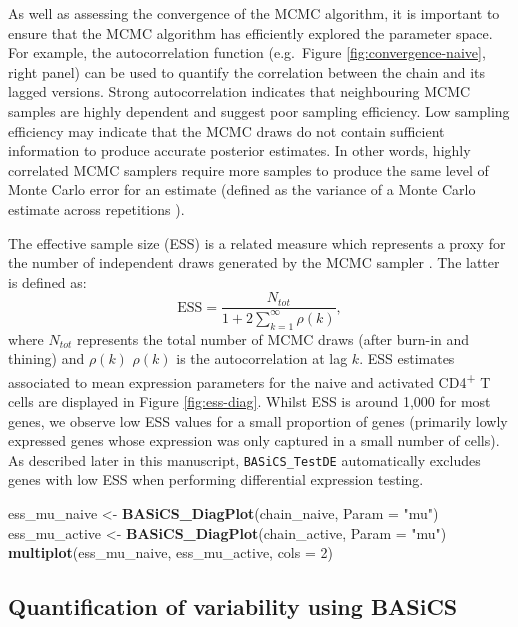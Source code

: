 \documentclass[9pt,a4paper,]{extarticle}
\newenvironment{Shaded}{\begin{snugshade}}{\end{snugshade}}
\newcommand{\DataTypeTok}[1]{\textcolor[rgb]{0.13,0.29,0.53}{#1}}
\newcommand{\DecValTok}[1]{\textcolor[rgb]{0.00,0.00,0.81}{#1}}
\newcommand{\KeywordTok}[1]{\textcolor[rgb]{0.13,0.29,0.53}{\textbf{#1}}}
\newcommand{\NormalTok}[1]{#1}
\newcommand{\StringTok}[1]{\textcolor[rgb]{0.31,0.60,0.02}{#1}}
\begin{document}
As well as assessing the convergence of the MCMC algorithm, it is important
to ensure that the MCMC algorithm has efficiently explored the parameter space.
For example, the autocorrelation function (e.g.~Figure
\ref{fig:convergence-naive}, right panel) can be used to quantify the
correlation between the chain and its lagged versions.
Strong autocorrelation indicates that neighbouring MCMC samples are highly
dependent and suggest poor sampling efficiency.
Low sampling efficiency may indicate that the MCMC draws do not contain
sufficient information to produce accurate posterior estimates.
In other words, highly correlated MCMC samplers require more samples to produce
the same level of Monte Carlo error for an estimate
(defined as the variance of a Monte Carlo estimate across repetitions \citep{Koehler2009}).

The effective sample size (ESS) is a related measure which represents a proxy
for the number of independent draws generated by the MCMC sampler \citep{Gelman2014}.
The latter is defined as:
\[
  \mbox{ESS} = \frac{N_{tot}}{1 + 2\sum_{k=1}^\infty \rho(k)},
\]
where \(N_{tot}\) represents the total number of MCMC draws (after burn-in and
thining) and \(\rho(k)\) \(\rho(k)\) is the autocorrelation at lag \(k\).
ESS estimates associated to mean expression parameters for the naive and
activated CD4\textsuperscript{+} T cells are displayed in Figure \ref{fig:ess-diag}.
Whilst ESS is around 1,000 for most genes, we observe low ESS values for a
small proportion of genes (primarily lowly expressed genes whose expression
was only captured in a small number of cells).
As described later in this manuscript, \texttt{BASiCS\_TestDE} automatically excludes
genes with low ESS when performing differential expression testing.

\begin{Shaded}
\begin{Highlighting}[]
\NormalTok{ess_mu_naive <-}\StringTok{ }\KeywordTok{BASiCS_DiagPlot}\NormalTok{(chain_naive, }\DataTypeTok{Param =} \StringTok{"mu"}\NormalTok{) }
\NormalTok{ess_mu_active <-}\StringTok{ }\KeywordTok{BASiCS_DiagPlot}\NormalTok{(chain_active, }\DataTypeTok{Param =} \StringTok{"mu"}\NormalTok{)}
\KeywordTok{multiplot}\NormalTok{(ess_mu_naive, ess_mu_active, }\DataTypeTok{cols =} \DecValTok{2}\NormalTok{)}
\end{Highlighting}
\end{Shaded}

\hypertarget{quantification-of-variability-using-basics}{%
\subsection{Quantification of variability using BASiCS}\label{quantification-of-variability-using-basics}}

{\small}
\end{document}
